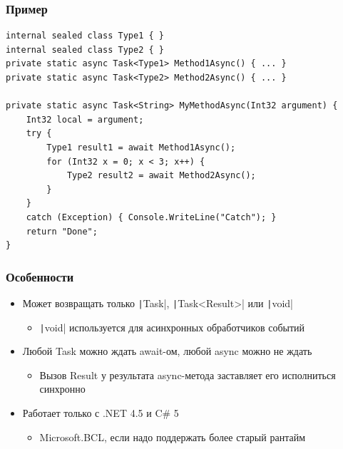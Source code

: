\documentclass[xetex,mathserif,serif]{beamer}
\begin{document}
	\begin{frame}[fragile]
		\frametitle{Пример}
		\begin{small}
			\begin{verbatim}
internal sealed class Type1 { }
internal sealed class Type2 { }
private static async Task<Type1> Method1Async() { ... }
private static async Task<Type2> Method2Async() { ... }

private static async Task<String> MyMethodAsync(Int32 argument) {
    Int32 local = argument;
    try {
        Type1 result1 = await Method1Async();
        for (Int32 x = 0; x < 3; x++) {
            Type2 result2 = await Method2Async();
        }
    }
    catch (Exception) { Console.WriteLine("Catch"); }
    return "Done";
}
			\end{verbatim}
		\end{small}
	\end{frame}

	\begin{frame}
		\frametitle{Особенности}
		\begin{itemize}
			\item Может возвращать только \texttt|Task|, \texttt|Task<Result>| или \texttt|void|
			\begin{itemize}
				\item \texttt|void| используется для асинхронных обработчиков событий
			\end{itemize}
			\item Любой Task можно ждать await-ом, любой async можно не ждать
			\begin{itemize}
				\item Вызов Result у результата async-метода заставляет его исполниться синхронно
			\end{itemize}
			\item Работает только с .NET 4.5 и C\# 5
			\begin{itemize}
				\item Microsoft.BCL, если надо поддержать более старый рантайм
			\end{itemize}
		\end{itemize}
	\end{frame}
\end{document}
